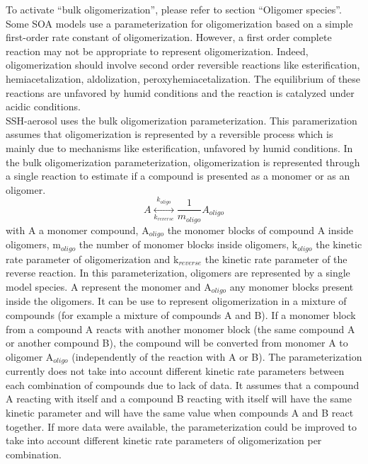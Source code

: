 \documentclass[a4paper,11pt]{article}
\begin{document}
To activate ``bulk oligomerization'', please refer to section ``Oligomer species''.\\
Some SOA models use a parameterization for oligomerization based on a simple first-order rate constant of oligomerization. However, a first order complete reaction may not be appropriate to represent oligomerization. Indeed,
 oligomerization should involve second order reversible reactions like esterification, hemiacetalization, aldolization,
peroxyhemiacetalization. The equilibrium of these reactions are unfavored by humid conditions and the reaction is catalyzed under acidic conditions.\\ 
\indent SSH-aerosol uses the bulk oligomerization parameterization. This paramerization assumes that oligomerization is represented by a reversible process which is mainly due to mechanisms like esterification, unfavored by humid conditions.
In the bulk oligomerization parameterization, oligomerization is represented through a single reaction to estimate if a compound is presented as a monomer or as an oligomer.
\begin{equation}
A \underset{k_{reverse}}{\overset{k_{oligo}}{\leftrightarrow}} \frac{1}{m_{oligo}} A_{oligo}
\label{oligo_reac}
\end{equation}
with A a monomer compound, A$_{oligo}$ the monomer blocks of compound A inside oligomers, m$_{oligo}$ the number of monomer blocks inside oligomers, k$_{oligo}$ the kinetic rate parameter of oligomerization and k$_{reverse}$ the kinetic rate parameter of the reverse reaction. In this parameterization, oligomers are represented 
by a single model species. A represent the monomer and A$_{oligo}$ any monomer blocks present inside the oligomers.
It can be use to represent oligomerization in a mixture of compounds (for example a mixture of compounds A and B).
If a monomer block from a compound A reacts with another monomer block (the same compound A or another compound B), the compound will be converted from monomer A to oligomer
 A$_{oligo}$ (independently of the reaction with A or B).  
The parameterization currently does not take into account different kinetic rate parameters between each combination of compounds due to lack of data. It assumes that a compound A reacting with itself and a compound B reacting with itself will have the same kinetic parameter and will have the same value when compounds A and B react together.
If more data were available, the parameterization could be improved to take into account different kinetic rate parameters of oligomerization per combination.\\
\end{document}
